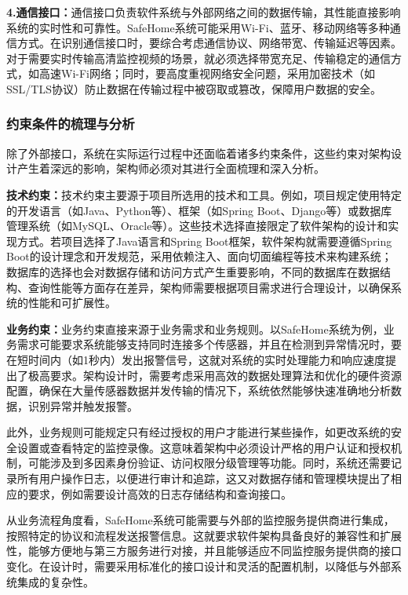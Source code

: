 \textbf{4.通信接口：}通信接口负责软件系统与外部网络之间的数据传输，其性能直接影响系统的实时性和可靠性。SafeHome系统可能采用Wi-Fi、蓝牙、移动网络等多种通信方式。在识别通信接口时，要综合考虑通信协议、网络带宽、传输延迟等因素。对于需要实时传输高清监控视频的场景，就必须选择带宽充足、传输稳定的通信方式，如高速Wi-Fi网络；同时，要高度重视网络安全问题，采用加密技术（如SSL/TLS协议）防止数据在传输过程中被窃取或篡改，保障用户数据的安全。

\subsubsection{约束条件的梳理与分析}

除了外部接口，系统在实际运行过程中还面临着诸多约束条件，这些约束对架构设计产生着深远的影响，架构师必须对其进行全面梳理和深入分析。

\textbf{技术约束：}技术约束主要源于项目所选用的技术和工具。例如，项目规定使用特定的开发语言（如Java、Python等）、框架（如Spring Boot、Django等）或数据库管理系统（如MySQL、Oracle等）。这些技术选择直接限定了软件架构的设计和实现方式。若项目选择了Java语言和Spring Boot框架，软件架构就需要遵循Spring Boot的设计理念和开发规范，采用依赖注入、面向切面编程等技术来构建系统；数据库的选择也会对数据存储和访问方式产生重要影响，不同的数据库在数据结构、查询性能等方面存在差异，架构师需要根据项目需求进行合理设计，以确保系统的性能和可扩展性。

\textbf{业务约束：}业务约束直接来源于业务需求和业务规则。以SafeHome系统为例，业务需求可能要求系统能够支持同时连接多个传感器，并且在检测到异常情况时，要在短时间内（如1秒内）发出报警信号，这就对系统的实时处理能力和响应速度提出了极高要求。架构设计时，需要考虑采用高效的数据处理算法和优化的硬件资源配置，确保在大量传感器数据并发传输的情况下，系统依然能够快速准确地分析数据，识别异常并触发报警。

此外，业务规则可能规定只有经过授权的用户才能进行某些操作，如更改系统的安全设置或查看特定的监控录像。这意味着架构中必须设计严格的用户认证和授权机制，可能涉及到多因素身份验证、访问权限分级管理等功能。同时，系统还需要记录所有用户操作日志，以便进行审计和追踪，这又对数据存储和管理模块提出了相应的要求，例如需要设计高效的日志存储结构和查询接口。

从业务流程角度看，SafeHome系统可能需要与外部的监控服务提供商进行集成，按照特定的协议和流程发送报警信息。这就要求软件架构具备良好的兼容性和扩展性，能够方便地与第三方服务进行对接，并且能够适应不同监控服务提供商的接口变化。在设计时，需要采用标准化的接口设计和灵活的配置机制，以降低与外部系统集成的复杂性。

